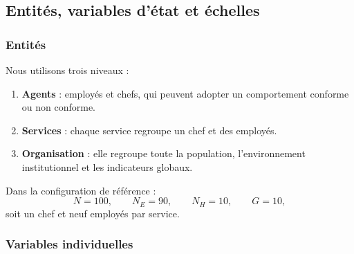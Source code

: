 \documentclass[11pt,a4paper]{article}
\begin{document}
\subsection{Entités, variables d’état et échelles}

\subsubsection{Entités}

Nous utilisons trois niveaux :

\begin{enumerate}
  \item \textbf{Agents} : employés et chefs, qui peuvent adopter un
  comportement conforme ou non conforme.
  \item \textbf{Services} : chaque service regroupe un chef et des employés.
  \item \textbf{Organisation} : elle regroupe toute la population,
  l’environnement institutionnel et les indicateurs globaux.
\end{enumerate}

Dans la configuration de référence :
\[
N=100,\qquad N_E=90,\qquad N_H=10,\qquad G=10,
\]
soit un chef et neuf employés par service.

\subsubsection{Variables individuelles}
\end{document}
